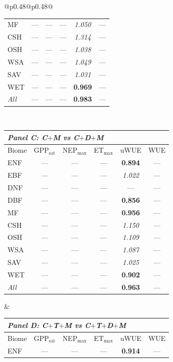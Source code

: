 \begin{table}[htbp]
\begin{tabular}{@{}p{0.48\linewidth}@{\hspace{0.04\linewidth}}p{0.48\linewidth}@{}}
\begin{tabular}{lccccc}
MF & --- & --- & --- & \textit{1.050} & --- \\
CSH & --- & --- & --- & \textit{1.314} & --- \\
OSH & --- & --- & --- & \textit{1.038} & --- \\
WSA & --- & --- & --- & \textit{1.049} & --- \\
SAV & --- & --- & --- & \textit{1.031} & --- \\
WET & --- & --- & --- & \textbf{0.969} & --- \\
\midrule
\textit{All} & --- & --- & --- & \textbf{0.983} & --- \\
\bottomrule
\end{tabular} \\[1.4em]
\footnotesize
\setlength{\tabcolsep}{3.5pt}
\renewcommand{\arraystretch}{1.06}
\begin{tabular}{lccccc}
\toprule
\multicolumn{6}{l}{\textit{Panel C: C$+$M vs C$+$D$+$M}} \\
\midrule
Biome & GPP$_\mathrm{sat}$ & NEP$_\mathrm{max}$ & ET$_\mathrm{max}$ & uWUE & WUE \\
\midrule
ENF & --- & --- & --- & \textbf{0.894} & --- \\
EBF & --- & --- & --- & \textit{1.022} & --- \\
DNF & --- & --- & --- & --- & --- \\
DBF & --- & --- & --- & \textbf{0.856} & --- \\
MF & --- & --- & --- & \textbf{0.956} & --- \\
CSH & --- & --- & --- & \textit{1.150} & --- \\
OSH & --- & --- & --- & \textit{1.109} & --- \\
WSA & --- & --- & --- & \textit{1.087} & --- \\
SAV & --- & --- & --- & \textit{1.025} & --- \\
WET & --- & --- & --- & \textbf{0.902} & --- \\
\midrule
\textit{All} & --- & --- & --- & \textbf{0.963} & --- \\
\bottomrule
\end{tabular} &
\footnotesize
\setlength{\tabcolsep}{3.5pt}
\renewcommand{\arraystretch}{1.06}
\begin{tabular}{lccccc}
\toprule
\multicolumn{6}{l}{\textit{Panel D: C$+$T$+$M vs C$+$T$+$D$+$M}} \\
\midrule
Biome & GPP$_\mathrm{sat}$ & NEP$_\mathrm{max}$ & ET$_\mathrm{max}$ & uWUE & WUE \\
\midrule
ENF & --- & --- & --- & \textbf{0.914} & --- \\

\end{tabular}
\end{tabular}
\end{table}
